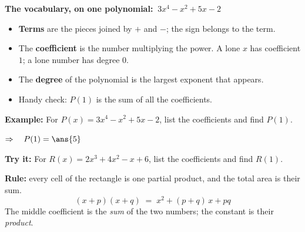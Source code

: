 \documentclass[12pt]{article}
\begin{document}


\begin{formulabox}
\textbf{The vocabulary, on one polynomial:} $\ 3x^4 - x^2 + 5x - 2$
\begin{itemize}[leftmargin=0.75cm, itemsep=1pt, topsep=2pt]
  \item \textbf{Terms} are the pieces joined by $+$ and $-$; the sign belongs to the term.
  \item The \textbf{coefficient} is the number multiplying the power. A lone $x$ has coefficient $1$; a lone number has degree $0$.
  \item The \textbf{degree} of the polynomial is the largest exponent that appears.
  \item Handy check: $P(1)$ is the sum of all the coefficients.
\end{itemize}
\end{formulabox}

\begin{examplebox}
\textbf{Example:} \quad For $P(x) = 3x^4 - x^2 + 5x - 2$, list the coefficients and find $P(1)$.

$\Rightarrow\quad P(1) = \ans{5}$
\end{examplebox}

\begin{tryitbox}
\textbf{Try it:} \quad For $R(x) = 2x^3 + 4x^2 - x + 6$, list the coefficients and find $R(1)$.\\[2pt]
\end{tryitbox}


\begin{formulabox}
\textbf{Rule:} every cell of the rectangle is one partial product, and the total area is their sum.
\[
  (x + p)(x + q) \;=\; x^2 + (p+q)\,x + pq
\]
The middle coefficient is the \emph{sum} of the two numbers; the constant is their \emph{product}.
\end{formulabox}
\end{document}
